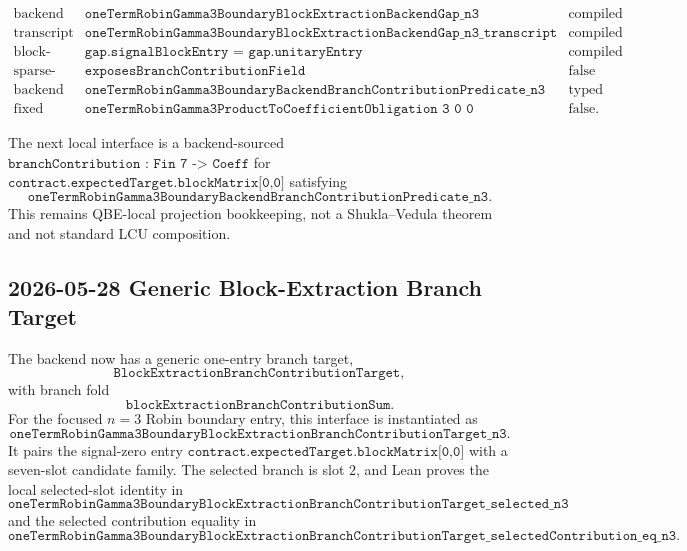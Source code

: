 \[
\begin{array}{lll}
\text{backend gap} &
\texttt{oneTermRobinGamma3BoundaryBlockExtractionBackendGap\_n3} &
\text{compiled}\\
\text{transcript} &
\texttt{oneTermRobinGamma3BoundaryBlockExtractionBackendGap\_n3\_transcript} &
\text{compiled}\\
\text{block-entry bridge} &
\texttt{gap.signalBlockEntry = gap.unitaryEntry} &
\text{compiled}\\
\text{sparse-slot summand family} &
\texttt{exposesBranchContributionField} &
\text{false}\\
\text{backend predicate} &
\texttt{oneTermRobinGamma3BoundaryBackendBranchContributionPredicate\_n3} &
\text{typed}\\
\text{fixed product theorem} &
\texttt{oneTermRobinGamma3ProductToCoefficientObligation\ 3\ 0\ 0} &
\text{false}.
\end{array}
\]

The next local interface is a backend-sourced
\(\texttt{branchContribution : Fin\ 7 -> Coeff}\) for
\(\texttt{contract.expectedTarget.blockMatrix[0,0]}\) satisfying
\[
  \texttt{oneTermRobinGamma3BoundaryBackendBranchContributionPredicate\_n3}.
\]
This remains QBE-local projection bookkeeping, not a Shukla--Vedula theorem
and not standard LCU composition.

\subsection{2026-05-28 Generic Block-Extraction Branch Target}

The backend now has a generic one-entry branch target,
\[
  \texttt{BlockExtractionBranchContributionTarget},
\]
with branch fold
\[
  \texttt{blockExtractionBranchContributionSum}.
\]
For the focused \(n=3\) Robin boundary entry, this interface is instantiated as
\[
  \texttt{oneTermRobinGamma3BoundaryBlockExtractionBranchContributionTarget\_n3}.
\]
It pairs the signal-zero entry \(\texttt{contract.expectedTarget.blockMatrix[0,0]}\)
with a seven-slot candidate family.  The selected branch is slot \(2\), and
Lean proves the local selected-slot identity in
\[
  \texttt{oneTermRobinGamma3BoundaryBlockExtractionBranchContributionTarget\_selected\_n3}
\]
and the selected contribution equality in
\[
  \texttt{oneTermRobinGamma3BoundaryBlockExtractionBranchContributionTarget\_selectedContribution\_eq\_n3}.
\]

